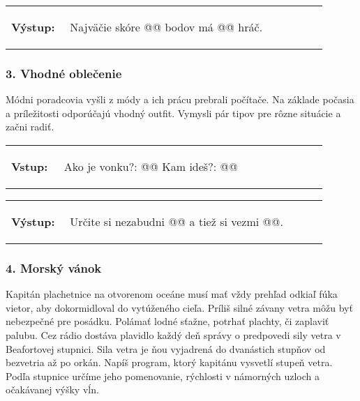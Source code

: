 \vspace{-2em}
\begin{tabular}{@{}p{0.15\linewidth}p{0.75\linewidth}}
\textbf{\small Výstup:} &
\vspace{-3em}
\begin{code}
Najväčie skóre @\fbox{\phantom{vstup}}@ bodov má @\fbox{\phantom{vstup}}@ hráč.
\end{code}
\end{tabular}
\vspace{-2em}


\subsubsection*{3. Vhodné oblečenie}
Módni poradcovia vyšli z módy a ich prácu prebrali počítače. Na základe počasia a príležitosti odporúčajú vhodný outfit. Vymysli pár tipov pre rôzne situácie a začni radiť.

\begin{tabular}{@{}p{0.15\linewidth}p{0.75\linewidth}}
\textbf{\small Vstup:} &
\vspace{-3em}
\begin{code}
Ako je vonku?: @\fbox{\phantom{vstup}}@
Kam ideš?: @\fbox{\phantom{vstup}}@
\end{code}
\end{tabular}

\vspace{-2em}
\begin{tabular}{@{}p{0.15\linewidth}p{0.75\linewidth}}
\textbf{\small Výstup:} &
\vspace{-3em}
\begin{code}
Určite si nezabudni @\fbox{\phantom{vstup}}@ a tiež si vezmi @\fbox{\phantom{vstup}}@.
\end{code}
\end{tabular}
\vspace{-2em}

\subsubsection*{4. Morský vánok}
Kapitán plachetnice na otvorenom oceáne musí mať vždy prehľad odkiaľ fúka vietor, aby dokormidloval do vytúženého cieľa. Príliš silné závany vetra môžu byť nebezpečné pre posádku. Polámať lodné sťažne, potrhať plachty, či zaplaviť palubu. Cez rádio dostáva plavidlo každý deň správy o predpovedi sily vetra v Beafortovej stupnici. Sila vetra je ňou vyjadrená do dvanástich stupňov od bezvetria až po orkán. Napíš program, ktorý kapitánu vysvetlí stupeň vetra. Podľa stupnice určíme jeho pomenovanie, rýchlosti v námorných uzloch a očakávanej výšky vĺn.

